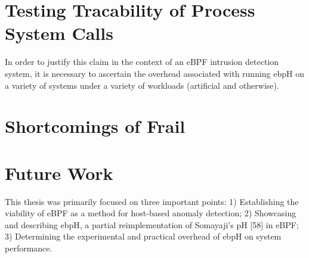 \documentclass{report}
\begin{document}
\begin{spacing}{1.5}



\chapter{Testing Tracability of Process System Calls}

{\large
In order to
justify this claim in the context of an eBPF intrusion detection system, it is necessary to
ascertain the overhead associated with running ebpH on a variety of systems under a variety
of workloads (artificial and otherwise).
}



\chapter{Shortcomings of Frail}

{\large

}


\chapter{Future Work}

{\large

This thesis was primarily focused on three important points:
1) Establishing the viability of eBPF as a method for host-based anomaly detection;
2) Showcasing and describing ebpH, a partial reimplementation of Somayaji’s pH [58] in
eBPF;
3) Determining the experimental and practical overhead of ebpH on system performance.
}



{\large


}


\end{spacing}
\end{document}
